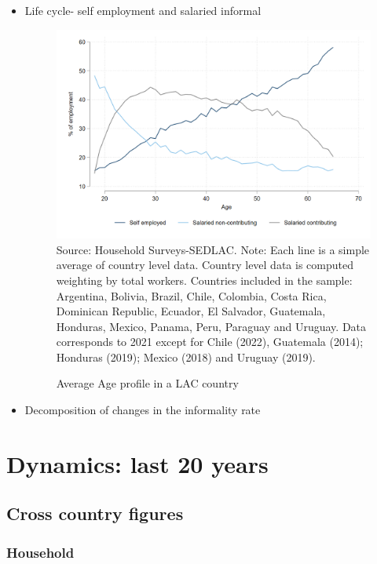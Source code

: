\documentclass[english]{article}
\begin{document}
\begin{itemize}
\begin{itemize}
\item Life cycle- self employment and salaried informal
 \begin{figure}[!htb]
        \justifying
        \caption{Average Age profile in a LAC country}     
        \includegraphics[scale=.3]{latex/figures/Snapshot/age_profile.png}
        \label{fig:age_pro}
        \footnotesize{Source: Household Surveys-SEDLAC.}
        \footnotesize{Note: Each line is a simple average of country level data. Country level data is computed weighting by total workers. Countries included in the sample: Argentina, Bolivia, Brazil, Chile, Colombia, Costa Rica, Dominican Republic, Ecuador, El Salvador, Guatemala, Honduras, Mexico, Panama, Peru, Paraguay and Uruguay. Data corresponds to 2021 except for  Chile (2022), Guatemala (2014); Honduras (2019); Mexico (2018) and Uruguay (2019).}
        \end{figure}
\item Decomposition of changes in the informality rate

\end{itemize}

     
     
\section{Dynamics: last 20 years}  

\subsection{Cross country figures}
\subsubsection{Household}


\end{itemize}
\end{document}
